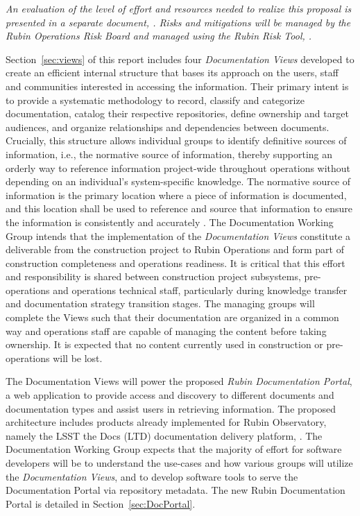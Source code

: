 \emph{An evaluation of the level of effort and resources needed to realize this proposal is presented in a separate document, . 
Risks and mitigations will be managed by the Rubin Operations Risk Board and managed using the Rubin Risk Tool, .}

Section~\ref{sec:views} of this report includes four \emph{Documentation Views} developed to create an efficient internal structure that bases its approach on the users, staff and communities interested in accessing the information.
Their primary intent is to provide a systematic methodology to record, classify and categorize documentation, catalog their respective repositories, define ownership and target audiences, and organize relationships and dependencies between documents.
Crucially, this structure allows individual groups to identify definitive sources of information, i.e., the normative source of information, thereby supporting an orderly way to reference information project-wide throughout operations without depending on an individual's system-specific knowledge.
The normative source of information is the primary location where a piece of information is documented, and this location shall be used to reference and source that information to ensure the information is consistently and accurately .
The Documentation Working Group intends that the implementation of the \emph{Documentation Views} constitute a deliverable from the construction project to Rubin Operations and form part of construction completeness and operations readiness.
It is critical that this effort and responsibility is shared between construction project subsystems, pre-operations and operations technical staff, particularly during knowledge transfer and documentation strategy transition stages.
The managing groups will complete the Views such that their documentation are organized in a common way and operations staff are capable of managing the content before taking ownership.
It is expected that no content currently used in construction or pre-operations will be lost.

The Documentation Views will power the proposed \emph{Rubin Documentation Portal}, a web application to provide access and discovery to different documents and documentation types and assist users in retrieving information.
The proposed architecture includes products already implemented for Rubin Observatory, namely the LSST the Docs (LTD) documentation delivery platform,  .
The Documentation Working Group expects that the majority of effort for software developers will be to understand the use-cases and how various groups will utilize the \emph{Documentation Views}, and to develop software tools to serve the Documentation Portal via repository metadata.
The new Rubin Documentation Portal is detailed in Section~\ref{sec:DocPortal}.

